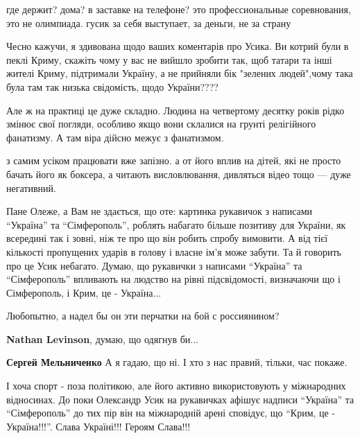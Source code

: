 \begin{itemize}
\begin{itemize}
где держит? дома? в заставке на телефоне? это профессиональные соревнования,
это не олимпиада. гусик за себя выступает, за деньги, не за страну

\end{itemize} %


Чесно кажучи, я здивована щодо ваших коментарів про Усика. Ви котрий були в
пеклі Криму, скажіть чому у вас не вийшло зробити так, щоб татари та інші жителі
Криму, підтримали Україну, а не прийняли бік "зелених людей",чому така була там
так низька свідомість, щодо України????



Але ж на практиці це дуже складно. Людина на четвертому десятку років рідко
змінює свої погляди, особливо якщо вони склалися на грунті релігійного
фанатизму. А там віра дійсно межує з фанатизмом.



з самим усіком працювати вже запізно. а от його вплив на дітей, які не просто
бачать його як боксера, а читають висловлювання, дивляться відео тощо — дуже
негативний.


Пане Олеже, а Вам не здається, що оте: картинка рукавичок з написами
\enquote{Україна} та \enquote{Сімферополь}, роблять набагато більше позитиву
для України, як всередині так і зовні, ніж те про що він робить спробу
вимовити. А від тієї кількості пропущених ударів в голову і власне ім'я може
забути. Та й говорить про це Усик небагато. Думаю, що рукавички з написами
\enquote{Україна} та \enquote{Сімферополь} впливають на людство на рівні
підсвідомості, визначаючи що і Сімферополь, і Крим, це - Україна...

\begin{itemize} %
Любопытно, а надел бы он эти перчатки на бой с россиянином?

\textbf{Nathan Levinson}, думаю, що одягнув би...

\textbf{Сергей Мельниченко} А я гадаю, що ні. І хто з нас правий, тільки, час покаже.


І хоча спорт - поза політикою, але його активно використовують у міжнародних
відносинах. До поки Олександр Усик на рукавичках афішує надписи \enquote{Україна} та
\enquote{Сімферополь} до тих пір він на міжнародній арені сповідує, що \enquote{Крим, це -
Україна!!!}. Слава Україні!!! Героям Слава!!!


\end{itemize}
\end{itemize}
